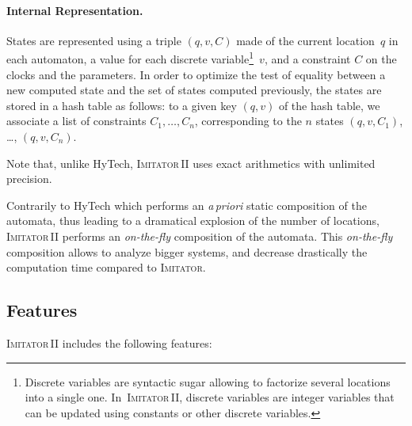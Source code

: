 \documentclass[a4paper,10pt]{article}
\newcommand{\hytech}{{\sc HyTech}}
\newcommand{\imitator}{\textsc{Imitator}}
\newcommand{\imitatordeux}{\textsc{Imitator}\,II}
\newcommand{\paragraphe}[1]{\paragraph{#1.}}
\begin{document}
\paragraphe{Internal Representation}
States are represented using a triple $(q, v, C)$ made of the current location~$q$ in each automaton, a value for each discrete variable\footnote{Discrete variables are syntactic sugar allowing to factorize several locations into a single one. In~\imitatordeux{}, discrete variables are integer variables that can be updated using constants or other discrete variables.}~$v$, and a constraint $C$ on the clocks and the parameters.
In order to optimize the test of equality between a new computed state and the set of states computed previously, the states are stored in a hash table as follows:
to a given key $(q, v)$ of the hash table, we associate a list of constraints $C_1, \dots, C_n$, corresponding to the $n$ states $(q, v, C_1)$, \dots, $(q, v, C_n)$.

Note that, unlike \hytech{}, \imitatordeux{} uses exact arithmetics with unlimited precision.

Contrarily to \hytech{} which performs an \emph{a\,priori} static composition of the automata, thus leading to a dramatical explosion of the number of locations, \imitatordeux{} performs an \emph{on-the-fly} composition of the automata.
This \emph{on-the-fly} composition allows to analyze bigger systems, and decrease drastically the computation time compared to \imitator{}. %




\subsection{Features} \label{ss:features}

\imitatordeux{} includes the following features:
\end{document}
